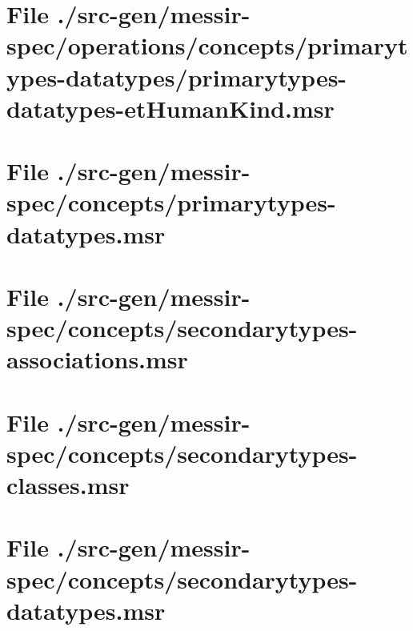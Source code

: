 \section[File /src-gen/messir-spec/operations.../primarytypes-datatypes-etHumanKind.msr]{File ./src-gen/messir-spec/operations/concepts/primarytypes-datatypes/primarytypes-datatypes-etHumanKind.msr}
\scriptsize

\normalsize
	
\section[File /src-gen/messir-spec/concepts/primarytypes-datatypes.msr]{File ./src-gen/messir-spec/concepts/primarytypes-datatypes.msr}
\scriptsize

\normalsize
	
\section[File /src-gen/messir-spec/concepts/secondarytypes-associations.msr]{File ./src-gen/messir-spec/concepts/secondarytypes-associations.msr}
\scriptsize

\normalsize
	
\section[File /src-gen/messir-spec/concepts/secondarytypes-classes.msr]{File ./src-gen/messir-spec/concepts/secondarytypes-classes.msr}
\scriptsize

\normalsize
	
\section[File /src-gen/messir-spec/concepts/secondarytypes-datatypes.msr]{File ./src-gen/messir-spec/concepts/secondarytypes-datatypes.msr}
\scriptsize

\normalsize
	
